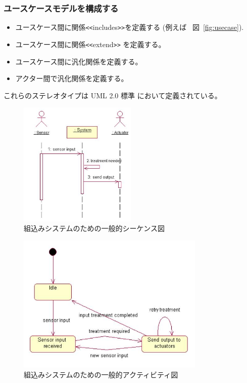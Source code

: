\documentclass[\pformat,12pt]{jreport}
\begin{document}
\subsubsection{ユースケースモデルを構成する}

\begin{itemize}
\item ユースケース間に関係{\tt <<}includes{\tt >>}を定義する
(例えば \ 図~\ref{fig:usecase}).
\item ユースケース間に関係{\tt <<}extend{\tt >>} を定義する。
\item ユースケース間に汎化関係を定義する。
\item アクター間で汎化関係を定義する。
\end{itemize}

これらのステレオタイプは UML 2.0 標準 \cite{UML20}において定義されている。

\begin{figure}
\begin{center}
\includegraphics[width=0.5\textwidth]{generalseqdia2}
\end{center}
\caption{組込みシステムのための一般的シーケンス図}\label{fig:seqdiag}
\end{figure}

\begin{figure}
\begin{center}
\includegraphics[width=0.8\textwidth]{generalstatedia}
\end{center}
\caption{組込みシステムのための一般的アクティビティ図}\label{fig:activitydiag}
\end{figure}
\end{document}
